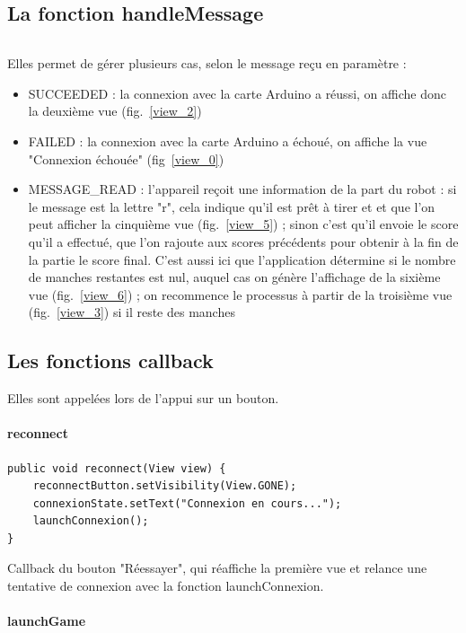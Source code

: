 \subsection{La fonction handleMessage}

\begin{lstlisting}
\end{lstlisting}
Elles permet de gérer plusieurs cas, selon le message reçu en paramètre :
\begin{itemize}
	\item SUCCEEDED : la connexion avec la carte Arduino a réussi, on affiche donc la deuxième vue (fig.~\ref{view_2})
	\item FAILED : la connexion avec la carte Arduino a échoué, on affiche la vue "Connexion échouée" (fig~\ref{view_0})
	\item MESSAGE\_READ : l'appareil reçoit une information de la part du robot : si le message est la lettre "r", cela indique qu'il est prêt à tirer et et que l'on peut afficher la cinquième vue (fig.~\ref{view_5}) ; sinon c'est qu'il envoie le score qu'il a effectué, que l'on rajoute aux scores précédents pour obtenir à la fin de la partie le score final. C'est aussi ici que l'application détermine si le nombre de manches restantes est nul, auquel cas on génère l'affichage de la sixième vue (fig.~\ref{view_6}) ; on recommence le processus à partir de la troisième vue (fig.~\ref{view_3}) si il reste des manches
\end{itemize}

\subsection{Les fonctions callback}

Elles sont appelées lors de l'appui sur un bouton.

\paragraph{reconnect}

\begin{lstlisting}
public void reconnect(View view) {
	reconnectButton.setVisibility(View.GONE);
	connexionState.setText("Connexion en cours...");
	launchConnexion();
}
\end{lstlisting}
Callback du bouton "Réessayer", qui réaffiche la première vue et relance une tentative de connexion avec la fonction launchConnexion.

\paragraph{launchGame}

